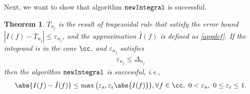 \documentclass{iitthesis}
\newtheorem{theorem}{Theorem}
\DeclareMathOperator{\newinteg}{\texttt{\textup{newIntegral}}}
\newcommand{\abstol}{\varepsilon_{\textrm{a}}}
\newcommand{\reltol}{\varepsilon_{\textrm{r}}}
\begin{document}
Next, we want to show that algorithm $\newinteg$ is successful.
\begin{theorem}
 $T_{n_j}$ is the result of trapezoidal rule that satisfy the error bound $|I(f)-T_{n_j}|\leq \varepsilon_{n_j}$, and the approximation $\hat{I}(f)$ is defined as \eqref{appdef}. If the integrand is in the cone  $\cc$, and $\varepsilon_{n_j}$ satisfies
\begin{align}
\label{upperbound}
\varepsilon_{n_j} \leq \Delta_{n_j}
\end{align}
then the algorithm $\newinteg$ is successful, i.e.,
\begin{align*}
\abs{I(f) - \hat{I}(f)} \le \max \big( \abstol,\reltol  \abs{I(f)} \big),\forall f \in \cc, \ 0 < \abstol,\ 0 \le \reltol \le 1. 
\end{align*}
\end{theorem}
\end{document}

